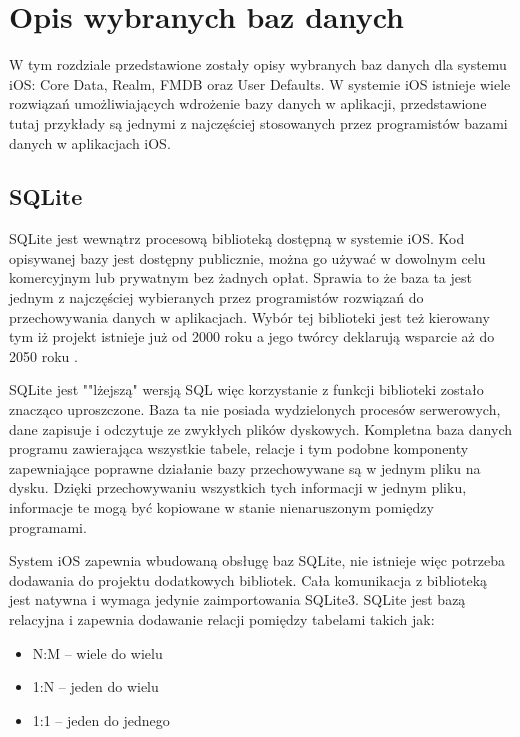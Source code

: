 \section{Opis wybranych baz danych}

W tym rozdziale przedstawione zostały opisy wybranych baz danych dla systemu iOS: Core Data, Realm, FMDB oraz User Defaults. W systemie iOS istnieje wiele rozwiązań umożliwiających wdrożenie bazy danych w aplikacji, przedstawione tutaj przykłady są jednymi z najczęściej stosowanych przez programistów bazami danych w aplikacjach iOS.

\subsection{SQLite}
SQLite jest wewnątrz procesową biblioteką dostępną w systemie iOS. Kod opisywanej bazy jest dostępny publicznie, można go używać w dowolnym celu komercyjnym lub prywatnym bez żadnych opłat. Sprawia to że baza ta jest jednym z najczęściej wybieranych przez programistów rozwiązań do przechowywania danych w aplikacjach. Wybór tej biblioteki jest też kierowany tym iż projekt istnieje już od 2000 roku a jego twórcy deklarują wsparcie aż do 2050 roku\cite{SQLite-doc} .\par

SQLite jest ""lżejszą" wersją SQL więc korzystanie z funkcji biblioteki zostało znacząco uproszczone. Baza ta nie posiada wydzielonych procesów serwerowych, dane zapisuje i odczytuje ze zwykłych plików dyskowych. Kompletna baza danych programu zawierająca wszystkie tabele, relacje i tym podobne komponenty zapewniające poprawne działanie bazy przechowywane są w jednym pliku na dysku. Dzięki przechowywaniu wszystkich tych informacji w jednym pliku, informacje te mogą być kopiowane w stanie nienaruszonym pomiędzy programami.\par

System iOS zapewnia wbudowaną obsługę baz SQLite, nie istnieje więc potrzeba dodawania do projektu dodatkowych bibliotek. Cała komunikacja z biblioteką jest natywna i wymaga jedynie zaimportowania SQLite3. 
SQLite jest bazą relacyjna i zapewnia dodawanie relacji pomiędzy tabelami takich jak: 

\begin{itemize}
  \item N:M – wiele do wielu
  \item 1:N – jeden do wielu
  \item 1:1 – jeden do jednego 
\end{itemize}

